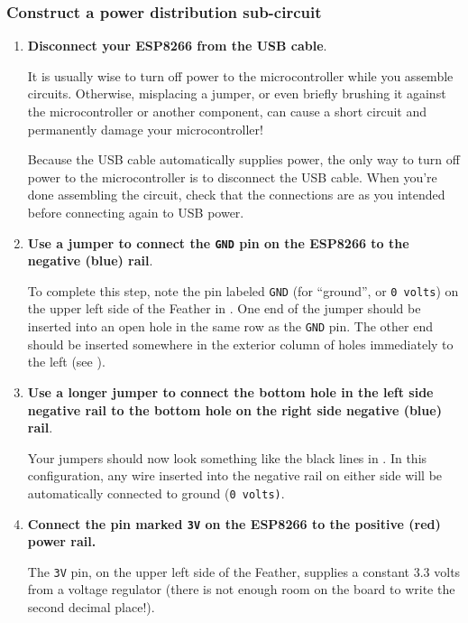 \subsubsection{\howto Construct a power distribution sub-circuit}
\begin{enumerate}
	\item \textbf{Disconnect your ESP8266 from the USB cable}.

	It is usually wise to turn off power to the microcontroller while you assemble circuits.
	Otherwise, misplacing a jumper, or even briefly brushing it against the microcontroller or another component, can cause a short circuit and permanently damage your microcontroller!

 	Because the USB cable automatically supplies power, the only way to turn off power to the microcontroller is to disconnect the USB cable.
	When you're done assembling the circuit, check that the connections are as you intended before connecting again to USB power.

	\item \textbf{Use a jumper to connect the \texttt{GND} pin on the ESP8266 to the negative (blue) rail}.

	To complete this step, note the pin labeled \texttt{GND} (for ``ground'', or \texttt{0 volts}) on the upper left side of the Feather in .
	One end of the jumper should be inserted into an open hole in the same row as the \texttt{GND} pin.
	The other end should be inserted somewhere in the exterior column of holes immediately to the left (see ).

	\item \textbf{Use a longer jumper to connect the bottom hole in the left side negative rail to the bottom hole on the right side negative (blue) rail}.

	Your jumpers should now look something like the black lines in .
	In this configuration, any wire inserted into the negative rail on either side will be automatically connected to ground (\texttt{0 volts)}.

	\item \textbf{Connect the pin marked \texttt{3V} on the ESP8266 to the positive (red) power rail.}

	The \texttt{3V} pin, on the upper left side of the Feather, supplies a constant 3.3 volts from a voltage regulator (there is not enough room on the board to write the second decimal place!).


\end{enumerate}
